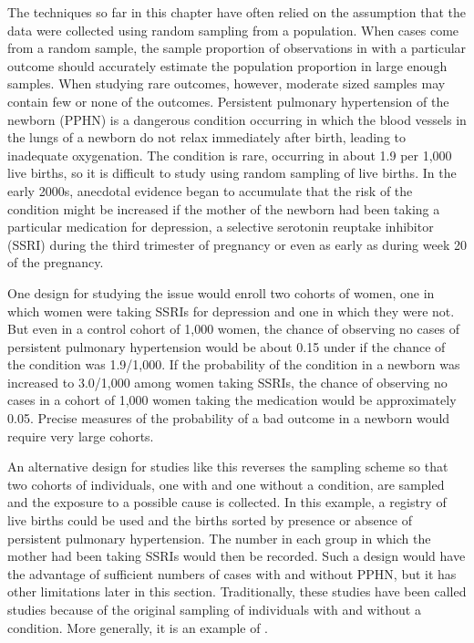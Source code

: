The techniques so far in this chapter have often relied on the assumption that the data were collected using random sampling from a population.  When cases come from a random sample, the sample proportion of observations in with a particular outcome should accurately estimate the population proportion in large enough samples.  When studying rare outcomes, however, moderate sized samples may contain few or none of the outcomes.  Persistent pulmonary hypertension of the newborn (PPHN) is a dangerous condition occurring in which the blood vessels in the lungs of a newborn do not relax immediately after birth, leading to inadequate oxygenation.   The condition is rare, occurring in about 1.9 per 1,000 live births, so it is difficult to study using random sampling of live births.  In the early 2000s, anecdotal evidence began to accumulate that the risk of the condition might be increased if the mother of the newborn had been taking a particular medication for depression, a selective serotonin reuptake inhibitor (SSRI) during the third trimester of pregnancy or even as early as during week 20 of the pregnancy.  

One design for studying the issue would enroll two cohorts of women, one in which women were taking SSRIs for depression and one in which they were not.  But even in a control cohort of 1,000 women, the chance of observing no cases of persistent pulmonary hypertension would be about 0.15 under if the chance of the condition was 1.9/1,000.  If the probability of the condition in a newborn was increased to 3.0/1,000 among women taking SSRIs, the chance of observing no cases in a cohort of 1,000 women taking the medication would be approximately 0.05.  Precise measures of the probability of a bad outcome in a newborn would require very large cohorts.

An alternative design for studies like this reverses the sampling scheme so that two cohorts of individuals, one with and one without a condition, are sampled and the exposure to a possible cause is collected.  In this example, a registry of live births could be used and the births sorted by presence or absence of persistent pulmonary hypertension. The number in each group in which the mother had been taking SSRIs would then be recorded. Such a design would have the advantage of sufficient numbers of cases with and without PPHN, but it has other limitations later in this section. Traditionally, these studies have been called  studies because of the original sampling of individuals with and without a condition.  More generally, it is an example of .



